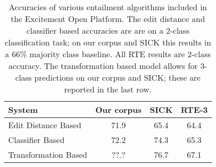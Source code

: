 %

%
%
\def\t#1{\small{#1}}
\def\b#1{\t{\textbf{#1}}}
\def\colspaceS{2.0mm}
\def\colspaceM{3.0mm}
\def\colspaceL{4.0mm}

\begin{table}
\begin{center}
\begin{tabular}{l@{\hskip \colspaceL}c@{\hskip \colspaceL}c@{\hskip \colspaceL}c}
\hline
\textbf{System} & \b{Our corpus} & \b{SICK} & \b{RTE-3} \\
\hline
\t{Edit Distance Based}  & \t{71.9} & \t{65.4} & \t{64.4} \\
\t{Classifier Based}     & \t{72.2} & \t{74.3} & \t{65.3} \\
\hline
\t{Transformation Based} & \t{??.?} & \t{76.7} & \t{67.1} \\
\hline
\end{tabular}
\end{center}
\caption{
\label{tab:eopresults}
Accuracies of various entailment algorithms included in the
  Excitement Open Platform.
The edit distance and classifier based accuracies are are on a 2-class
  classification task; on our corpus and SICK this results in a 66\%
  majority class baseline.
All RTE results are 2-class accuracy.
The transformation based model allows for 3-class predictions on our
  corpus and SICK; these are reported in the last row.
}
\end{table}
%
%

